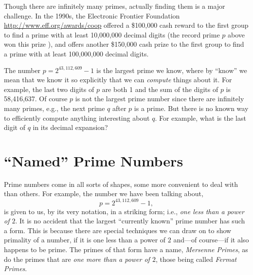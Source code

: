 \documentclass[openany]{book}
\theoremstyle{plain}
\theoremstyle{definition}
\begin{document}
Though there are infinitely many primes, actually finding them is a
major challenge.  In the 1990s, the Electronic Frontier Foundation
\url{http://www.eff.org/awards/coop} offered a \$100,000 cash reward
to the first group to find a prime with at least 10,000,000 decimal
digits (the record prime $p$ above won this prize ), and offers
another \$150,000 cash prize to the first group to find a prime with
at least 100,000,000 decimal digits.


The number $p= 2^{43,112,609} - 1$  is the largest prime we know, where by
``know'' we mean that we know it so explicitly that we can {\em
  compute} things about it.  For example, the last two digits of $p$
are both 1 and the sum of the digits of $p$ is 58,416,637.\label{sumdigits}  Of course $p$ is not
the largest prime number since there are infinitely many primes, e.g.,
the next prime $q$ after $p$ is a prime.  But there is no known way
to efficiently compute anything interesting about $q$.  For example,
what is the last digit of $q$ in its decimal expansion?


\chapter{``Named'' Prime Numbers}
Prime numbers come in all sorts of shapes, some more convenient to
deal with than others.  For example, the number we have been talking
about, $$p = 2^{43,112,609}-1,$$ is given to us, by its very notation,
in a striking form; i.e., {\it one less than a power of $2$}. It is no
accident that the largest ``currently known'' prime number has such a
form.  This is because there are special techniques we can draw on to
show primality of a number, if it is one less than a power of $2$
and---of course---if it also happens to be prime.  The primes of that
form have a name, {\it Mersenne Primes}, as do the primes that are
{\it one more than a power of $2$}, those being called {\it Fermat
  Primes}.
 
\end{document}
